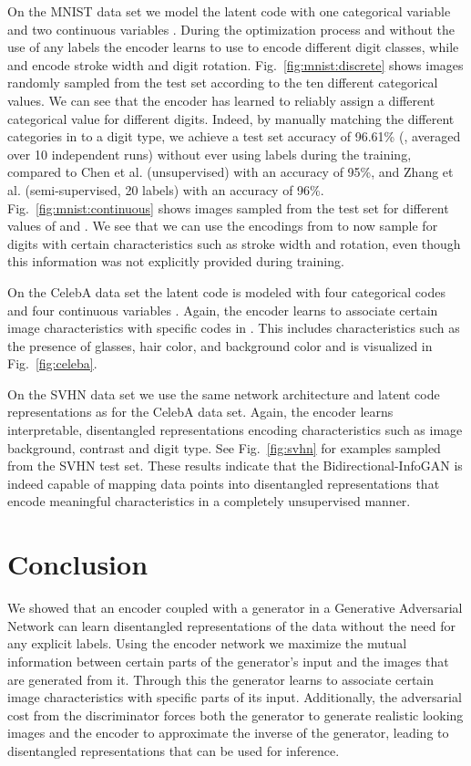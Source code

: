 \documentclass{esannV2}
\begin{document}
On the MNIST data set we model the latent code  with one categorical variable  and two continuous variables . During the optimization process and without the use of any labels the encoder learns to use  to encode different digit classes, while  and  encode stroke width and digit rotation. Fig.~\ref{fig:mnist:discrete} shows images randomly sampled from the test set according to the ten different categorical values. We can see that the encoder has learned to reliably assign a different categorical value for different digits. Indeed, by manually matching the different categories in  to a digit type, we achieve a test set accuracy of 96.61\% (, averaged over 10 independent runs)  without ever using labels during the training, compared to Chen et al. \cite{Chen2016} (unsupervised) with an accuracy of 95\%, and Zhang et al. \cite{Zhang2017} (semi-supervised, 20 labels) with an accuracy of 96\%. Fig.~\ref{fig:mnist:continuous} shows images sampled from the test set for different values of  and . We see that we can use the encodings from  to now sample for digits with certain characteristics such as stroke width and rotation, even though this information was not explicitly provided during training.

On the CelebA data set the latent code is modeled with four categorical codes  and four continuous variables . Again, the encoder learns to associate certain image characteristics with specific codes in . This includes characteristics such as the presence of glasses, hair color, and background color and is visualized in Fig.~\ref{fig:celeba}.

On the SVHN data set we use the same network architecture and latent code representations as for the CelebA data set. Again, the encoder learns interpretable, disentangled representations encoding characteristics such as image background, contrast and digit type. See Fig.~\ref{fig:svhn} for examples sampled from the SVHN test set. These results indicate that the Bidirectional-InfoGAN is indeed capable of mapping data points into disentangled representations that encode meaningful characteristics in a completely unsupervised manner.

\section{Conclusion}
We showed that an encoder coupled with a generator in a Generative Adversarial Network can learn disentangled representations of the data without the need for any explicit labels. Using the encoder network we maximize the mutual information between certain parts of the generator's input and the images that are generated from it. Through this the generator learns to associate certain image characteristics with specific parts of its input. Additionally, the adversarial cost from the discriminator forces both the generator to generate realistic looking images and the encoder to approximate the inverse of the generator, leading to disentangled representations that can be used for inference.
\end{document}
